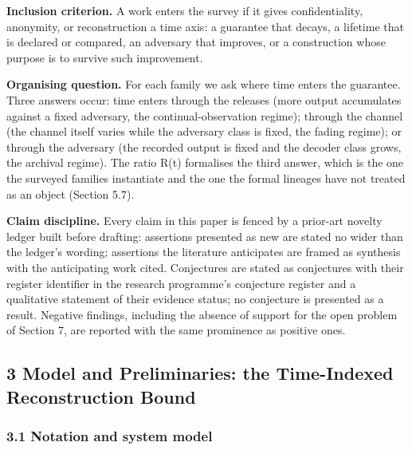 \documentclass[
]{llncs}
\begin{document}
\textbf{Inclusion criterion.} A work enters the survey if it gives
confidentiality, anonymity, or reconstruction a time axis: a guarantee
that decays, a lifetime that is declared or compared, an adversary that
improves, or a construction whose purpose is to survive such
improvement.

\textbf{Organising question.} For each family we ask where time enters
the guarantee. Three answers occur: time enters through the releases
(more output accumulates against a fixed adversary, the
continual-observation regime); through the channel (the channel itself
varies while the adversary class is fixed, the fading regime); or
through the adversary (the recorded output is fixed and the decoder
class grows, the archival regime). The ratio R(t) formalises the third
answer, which is the one the surveyed families instantiate and the one
the formal lineages have not treated as an object (Section 5.7).

\textbf{Claim discipline.} Every claim in this paper is fenced by a
prior-art novelty ledger built before drafting: assertions presented as
new are stated no wider than the ledger's wording; assertions the
literature anticipates are framed as synthesis with the anticipating
work cited. Conjectures are stated as conjectures with their register
identifier in the research programme's conjecture register and a
qualitative statement of their evidence status; no conjecture is
presented as a result. Negative findings, including the absence of
support for the open problem of Section 7, are reported with the same
prominence as positive ones.

\subsection{3 Model and Preliminaries: the Time-Indexed Reconstruction
Bound}\label{model-and-preliminaries-the-time-indexed-reconstruction-bound}

\subsubsection{3.1 Notation and system
model}\label{notation-and-system-model}
\end{document}
